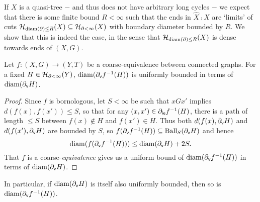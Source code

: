 \documentclass{amsart}
\begin{document}
    If $X$ is a quasi-tree $-$ and thus does not have arbitrary long cycles $-$ we expect that there is some finite bound $R<\infty$ such that the ends in $\widehat{X}\comp X$ are `limits' of cuts $\mathcal{H}_{\operatorname{diam}(\partial)\leq R}(X)\subseteq\mathcal{H}_{\partial<\infty}(X)$ with boundary diameter bounded by $R$. We show that this is indeed the case, in the sense that $\mathcal{H}_{\operatorname{diam}(\partial)\leq R}(X)$ is dense towards ends of $(X,G)$.

    \begin{lemma}\label{lem:coarse_equivalence_controls_boundary_diameter}
        Let $f:(X,G)\to(Y,T)$ be a coarse-equivalence between connected graphs. For a fixed $H\in\mathcal{H}_{\partial<\infty}(Y)$, $\operatorname{diam}(\partial_{\textsf{v}}f^{-1}(H))$ is uniformly bounded in terms of $\operatorname{diam}(\partial_{\textsf{v}}H)$.
    \end{lemma}
    \begin{proof}
        Since $f$ is bornologous, let $S<\infty$ be such that $xGx'$ implies $d(f(x),f(x'))\leq S$, so that for any $(x,x')\in\partial_{\textsf{ie}}f^{-1}(H)$, there is a path of length $\leq S$ between $f(x)\not\in H$ and $f(x')\in H$. Thus both $d(f(x),\partial_{\textsf{v}}H)$ and $d(f(x'),\partial_{\textsf{v}}H)$ are bounded by $S$, so $f(\partial_{\textsf{v}}f^{-1}(H))\subseteq\operatorname{Ball}_S(\partial_{\textsf{v}}H)$ and hence
        \begin{equation*}
            \operatorname{diam}(f(\partial_{\textsf{v}}f^{-1}(H)))\leq\operatorname{diam}(\partial_{\textsf{v}}H)+2S.
        \end{equation*}
        That $f$ is a coarse-\textit{equivalence} gives us a uniform bound of $\operatorname{diam}(\partial_{\textsf{v}}f^{-1}(H))$ in terms of $\operatorname{diam}(\partial_{\textsf{v}}H)$.
    \end{proof}

    In particular, if $\operatorname{diam}(\partial_{\textsf{v}}H)$ is itself also uniformly bounded, then so is $\operatorname{diam}(\partial_{\textsf{v}}f^{-1}(H))$.
\end{document}
